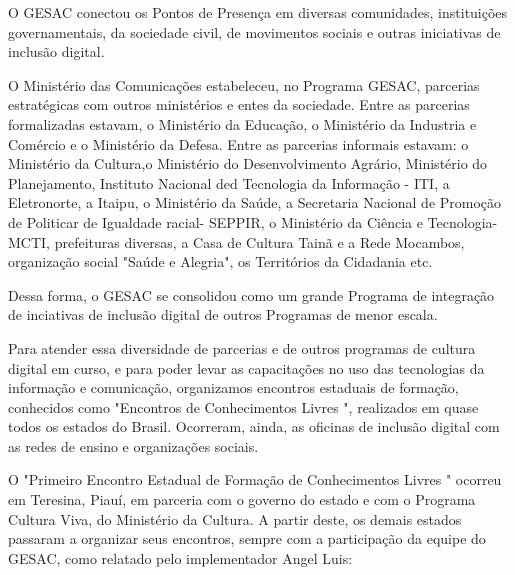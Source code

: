 O GESAC conectou os Pontos de Presença em diversas comunidades, instituições governamentais, da sociedade civil, de movimentos sociais e outras iniciativas de inclusão digital.

O Ministério das Comunicações estabeleceu, no Programa GESAC, parcerias estratégicas com outros ministérios e entes da sociedade. Entre as parcerias formalizadas estavam, o Ministério da Educação, o Ministério da Industria e Comércio e o Ministério da Defesa. Entre as parcerias informais estavam: o Ministério da Cultura,o Ministério do Desenvolvimento Agrário, Ministério do Planejamento, Instituto  Nacional ded Tecnologia da Informação - ITI,  a Eletronorte, a Itaipu, o Ministério da Saúde, a Secretaria Nacional de Promoção de Politicar de Igualdade racial- SEPPIR, o Ministério da Ciência e Tecnologia-MCTI,  prefeituras diversas, a Casa de Cultura Tainã e a Rede Mocambos, organização social "Saúde e Alegria", os Territórios da Cidadania etc.

Dessa forma, o GESAC se consolidou como um grande Programa de integração de inciativas de inclusão digital de outros Programas de menor escala.

Para atender essa diversidade de parcerias e de outros programas de cultura digital em curso, e para poder levar as capacitações no uso das tecnologias da informação e comunicação, organizamos encontros estaduais de formação, conhecidos como "Encontros de Conhecimentos Livres ", realizados em  quase todos os estados do Brasil. Ocorreram, ainda, as  oficinas de inclusão digital com as redes de ensino e organizações sociais.

O "Primeiro Encontro Estadual de Formação de Conhecimentos Livres " ocorreu em  Teresina, Piauí, em parceria com o governo do estado e com  o Programa Cultura Viva, do Ministério da Cultura. A partir deste, os demais estados passaram a organizar seus encontros, sempre com a participação da equipe do GESAC, como relatado pelo implementador Angel Luis:


\noindent\begin{flushright}\mbox{\linespread{1}\selectfont\centering{}}\end{flushright}


